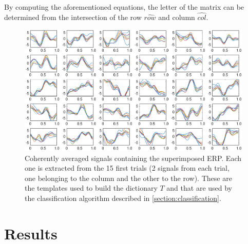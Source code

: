 \documentclass[brainsci,article,submit,moreauthors,pdftex,10pt,a4paper]{mdpi}
\begin{document}
By computing the aforementioned equations, the letter of the matrix can be determined from the intersection of the row $ \hat{row} $ and column $ \hat{col} $.  %





\begin{figure}[H]
\centering
\includegraphics[width=15cm]{images/dictionary.eps}
\caption{Coherently averaged signals containing the superimposed ERP.  Each one is extracted from the 15 first trials (2 signals from each trial, one belonging to the column and the other to the row).  These are the templates used to build the dictionary $T$ and that are used by the classification algorithm described in \ref{section:classification}.}
\label{fig:dictionaryfig}
\end{figure}


\section{Results}
\label{section:results}
\end{document}
